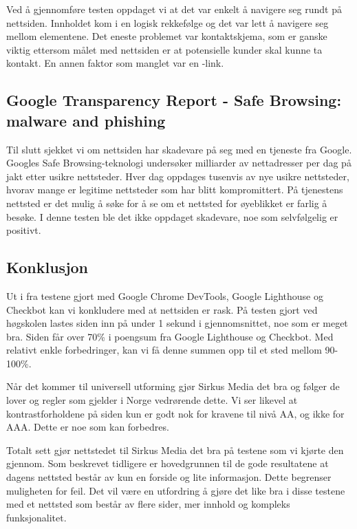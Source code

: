 Ved å gjennomføre testen oppdaget vi at det var enkelt å navigere seg rundt på nettsiden. Innholdet kom i en logisk rekkefølge og det var lett å navigere seg mellom elementene. Det eneste problemet var kontaktskjema, som er ganske viktig ettersom målet med nettsiden er at potensielle kunder skal kunne ta kontakt. En annen faktor som manglet var en -link.

\subsection{Google Transparency Report - Safe Browsing: malware and phishing}
Til slutt sjekket vi om nettsiden har skadevare på seg med en tjeneste fra Google. Googles Safe Browsing-teknologi \cite{google2019sbs} undersøker milliarder av nettadresser per dag på jakt etter usikre nettsteder. Hver dag oppdages tusenvis av nye usikre nettsteder, hvorav mange er legitime nettsteder som har blitt kompromittert. På tjenestens nettsted er det mulig å søke for å se om et nettsted for øyeblikket er farlig å besøke. I denne testen  ble det ikke oppdaget skadevare, noe som selvfølgelig er positivt.

\subsection{Konklusjon}
\label{sec:analysis-original-website}
Ut i fra testene gjort med Google Chrome DevTools, Google Lighthouse og Checkbot kan vi konkludere med at nettsiden er rask. På testen gjort ved høgskolen lastes siden inn på under 1 sekund i gjennomsnittet, noe som er meget bra. Siden får over 70\% i poengsum fra Google Lighthouse og Checkbot. Med relativt enkle forbedringer, kan vi få denne summen opp til et sted mellom 90-100\%.

Når det kommer til universell utforming gjør Sirkus Media det bra og følger de lover og regler som gjelder i Norge vedrørende dette. Vi ser likevel at kontrastforholdene på siden kun er godt nok for kravene til nivå AA, og ikke for AAA. Dette er noe som kan forbedres.

Totalt sett gjør nettstedet til Sirkus Media det bra på testene som vi kjørte den gjennom. Som beskrevet tidligere er hovedgrunnen til de gode resultatene at dagens nettsted består av kun en forside og lite informasjon. Dette begrenser muligheten for feil. Det vil være en utfordring å gjøre det like bra i disse testene med et nettsted som består av flere sider, mer innhold og kompleks funksjonalitet.

